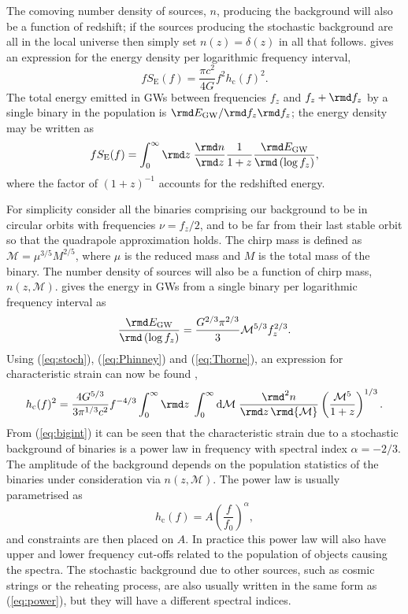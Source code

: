 \documentclass[fleqn,12pt]{iopart}
\newcommand{\sub}[1]{\ensuremath{_\mathrm{#1}}}
\begin{document}
The comoving number density of sources, $n$, producing the background will also be a function of redshift; if the sources producing the stochastic background are all in the local universe then simply set $n(z) = \delta (z)$ in all that follows.  gives an expression for the energy density per logarithmic frequency interval,
\begin{equation}\label{eq:stoch}
fS\sub{E}(f) = \frac{\pi c^{2}}{4G}f^{2}h\sub{c}(f)^{2}.
\end{equation}
The total energy emitted in GWs between frequencies $f_{z}$ and $f_{z}+\rmd f_{z}$ by a single binary in the population is $\rmd E\sub{GW}/\rmd f_{z}\rmd f_{z}$; the energy density may be written as
\begin{equation}\label{eq:Phinney}
fS\sub{E}(f) = \int_{0}^{\infty}\rmd z\; \frac{\rmd n}{\rmd z}\frac{1}{1+z}\frac{\rmd E\sub{GW}}{\rmd\left(\log f_{z} \right)},
\end{equation}
where the factor of $\left( 1+z \right)^{-1}$ accounts for the redshifted energy.

For simplicity consider all the binaries comprising our background to be in circular orbits with frequencies $\nu = f_{z}/2$, and to be far from their last stable orbit so that the quadrapole approximation holds. The chirp mass is defined as ${\mathcal{M}} = \mu^{3/5}M^{2/5}$, where $\mu$ is the reduced mass and $M$ is the total mass of the binary. The number density of sources will also be a function of chirp mass, $n(z,{\mathcal{M}})$. \citet{Thorne1987} gives the energy in GWs from a single binary per logarithmic frequency interval as
\begin{equation}\label{eq:Thorne}
\frac{\rmd E\sub{GW}}{\rmd\left(\log f_z \right)} = \frac{G^{2/3}\pi^{2/3}}{3}{\mathcal{M}}^{5/3}f_{z}^{2/3}.
\end{equation}
Using (\ref{eq:stoch}), (\ref{eq:Phinney}) and (\ref{eq:Thorne}), an expression for characteristic strain can now be found \citep{Sesana2008},
\begin{equation}\label{eq:bigint}
h\sub{c}(f)^{2}=\frac{4G^{5/3}}{3\pi^{1/3}c^{2}}f^{-4/3}\int_{0}^{\infty}\rmd z\;\int_{0}^{\infty}\textrm{d}{\mathcal{M}}\;\frac{\rmd^{2}n}{\rmd z\,\rmd{\mathcal{M}}}\left( \frac{{\mathcal{M}}^{5}}{1+z} \right)^{1/3}.
\end{equation}
From (\ref{eq:bigint}) it can be seen that the characteristic strain due to a stochastic background of binaries is a power law in frequency with spectral index $\alpha = -2/3$. The amplitude of the background depends on the population statistics of the binaries under consideration via $n(z,{\mathcal{M}})$. The power law is usually parametrised as
\begin{equation}\label{eq:power}
h\sub{c}(f)= A\left(\frac{f}{f_{0}}\right)^{\alpha},
\end{equation}
and constraints are then placed on $A$. In practice this power law will also have upper and lower frequency cut-offs related to the population of objects causing the spectra. The stochastic background due to other sources, such as cosmic strings or the reheating process, are also usually written in the same form as (\ref{eq:power}), but they will have a different spectral indices.
\end{document}
